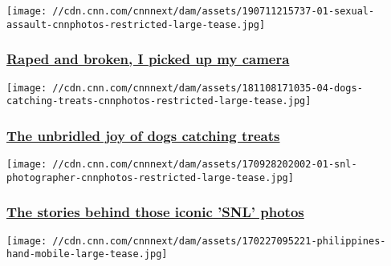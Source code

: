 \texttt{[image: //cdn.cnn.com/cnnnext/dam/assets/190711215737-01-sexual-assault-cnnphotos-restricted-large-tease.jpg]}

\hypertarget{raped-and-broken-i-picked-up-my-camera}{%
\subsubsection{\texorpdfstring{\href{https://www.cnn.com/interactive/2019/07/opinions/rosem-morton-sexual-assault-cnnphotos/index.html}{Raped
and broken, I picked up my
camera}}{Raped and broken, I picked up my camera}}\label{raped-and-broken-i-picked-up-my-camera}}

\href{https://www.cnn.com/interactive/2018/11/entertainment/dogs-catching-treats-cnnphotos/index.html}{}

\texttt{[image: //cdn.cnn.com/cnnnext/dam/assets/181108171035-04-dogs-catching-treats-cnnphotos-restricted-large-tease.jpg]}

\hypertarget{the-unbridled-joy-of-dogs-catching-treats}{%
\subsubsection{\texorpdfstring{\href{https://www.cnn.com/interactive/2018/11/entertainment/dogs-catching-treats-cnnphotos/index.html}{The
unbridled joy of dogs catching
treats}}{The unbridled joy of dogs catching treats}}\label{the-unbridled-joy-of-dogs-catching-treats}}

\href{http://www.cnn.com/interactive/2017/09/entertainment/saturday-night-live-photographer-cnnphotos/index.html}{}

\texttt{[image: //cdn.cnn.com/cnnnext/dam/assets/170928202002-01-snl-photographer-cnnphotos-restricted-large-tease.jpg]}

\hypertarget{the-stories-behind-those-iconic-snl-photos}{%
\subsubsection{\texorpdfstring{\href{http://www.cnn.com/interactive/2017/09/entertainment/saturday-night-live-photographer-cnnphotos/index.html}{The
stories behind those iconic 'SNL'
photos}}{The stories behind those iconic 'SNL' photos}}\label{the-stories-behind-those-iconic-snl-photos}}

\href{http://www.cnn.com/interactive/2017/03/world/city-of-the-dead/}{}

\texttt{[image: //cdn.cnn.com/cnnnext/dam/assets/170227095221-philippines-hand-mobile-large-tease.jpg]}

